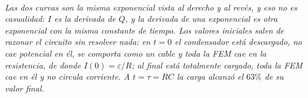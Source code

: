 \begin{center}
\\[0.5em]
{\small\itshape Las dos curvas son la misma exponencial vista al derecho y al
revés, y eso no es casualidad: $I$ es la derivada de $Q$, y la derivada de una
exponencial es otra exponencial con la misma constante de tiempo. Los valores
iniciales salen de razonar el circuito sin resolver nada: en $t=0$ el
condensador está descargado, no cae potencial en él, se comporta como un cable y
toda la FEM cae en la resistencia, de donde $I(0)=\varepsilon/R$; al final está
totalmente cargado, toda la FEM cae en él y no circula corriente. A $t=\tau=RC$
la carga alcanzó el $63\%$ de su valor final.}
\end{center}
